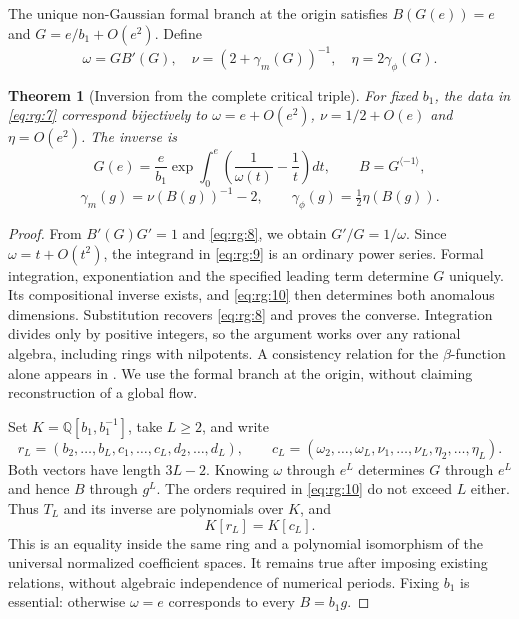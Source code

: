 \documentclass[11pt,a4paper,oneside]{article}
\theoremstyle{plain}
\newtheorem{theorem}{Theorem}[section]
\theoremstyle{definition}
\theoremstyle{remark}
\numberwithin{equation}{section}
\begin{document}
The unique non-Gaussian formal branch at the origin satisfies $B(G(e))=e$ and $G=e/b_1+O(e^2)$. Define
\begin{equation}
\omega=GB'(G),\quad
 \nu=(2+\gamma_m(G))^{-1},\quad
 \eta=2\gamma_\phi(G).                             \label{eq:rg:8}
\end{equation}

\begin{theorem}[Inversion from the complete critical triple]\label{thm:rg:4.1}
For fixed $b_1$, the data in \eqref{eq:rg:7} correspond bijectively to $\omega=e+O(e^2)$, $\nu=1/2+O(e)$ and $\eta=O(e^2)$. The inverse is
\begin{equation}
G(e)=\frac e{b_1}
 \exp\int_0^e\left(\frac1{\omega(t)}-\frac1t\right)dt,\qquad
 B=G^{\langle-1\rangle},                            \label{eq:rg:9}
\end{equation}
\begin{equation}
\gamma_m(g)=\nu(B(g))^{-1}-2,\qquad
 \gamma_\phi(g)=\tfrac12\eta(B(g)).                 \label{eq:rg:10}
\end{equation}
\end{theorem}
\begin{proof}
From $B'(G)G'=1$ and \eqref{eq:rg:8}, we obtain $G'/G=1/\omega$. Since $\omega=t+O(t^2)$, the integrand in \eqref{eq:rg:9} is an ordinary power series. Formal integration, exponentiation and the specified leading term determine $G$ uniquely. Its compositional inverse exists, and \eqref{eq:rg:10} then determines both anomalous dimensions. Substitution recovers \eqref{eq:rg:8} and proves the converse. Integration divides only by positive integers, so the argument works over any rational algebra, including rings with nilpotents. A consistency relation for the $\beta$-function alone appears in \cite[equation (3)]{antipin}. We use the formal branch at the origin, without claiming reconstruction of a global flow.

Set $K=\mathbb Q[b_1,b_1^{-1}]$, take $L\geq2$, and write
\begin{equation}
r_L=(b_2,\ldots,b_L,c_1,\ldots,c_L,d_2,\ldots,d_L),\qquad
 c_L=(\omega_2,\ldots,\omega_L,\nu_1,\ldots,\nu_L,
                    \eta_2,\ldots,\eta_L).
\end{equation}
Both vectors have length $3L-2$. Knowing $\omega$ through $e^L$ determines $G$ through $e^L$ and hence $B$ through $g^L$. The orders required in \eqref{eq:rg:10} do not exceed $L$ either. Thus $T_L$ and its inverse are polynomials over $K$, and
\begin{equation}
K[r_L]=K[c_L].                                    \label{eq:rg:11}
\end{equation}
This is an equality inside the same ring and a polynomial isomorphism of the universal normalized coefficient spaces. It remains true after imposing existing relations, without algebraic independence of numerical periods. Fixing $b_1$ is essential: otherwise $\omega=e$ corresponds to every $B=b_1g$.
\end{proof}
\end{document}

